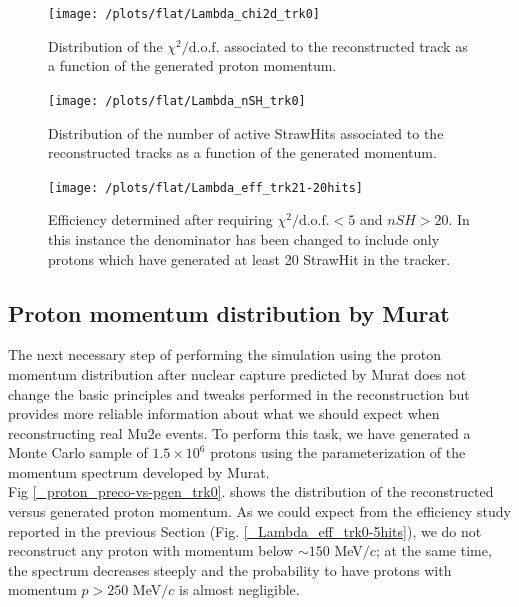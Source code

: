 \documentclass[12pt,a4paper,openright, oneside, titlepage]{book} %
\begin{document}
\begin{figure}[!htb]
\centering
\texttt{[image: /plots/flat/Lambda\_chi2d\_trk0]}
\caption[$\chi^2/\textrm{d.o.f.}$ associated to the tracks]
{Distribution of the $\chi^2/\textrm{d.o.f.}$ associated to the reconstructed track 
as a function of the generated proton momentum.}
\label{_Lambda_chi2d_trk0}
\end{figure}

\begin{figure}[!htb]
\centering
\texttt{[image: /plots/flat/Lambda\_nSH\_trk0]}
\caption[Number of StrawHits associated to a track per generated momentum]{Distribution of the number of active StrawHits associated to the reconstructed tracks 
as a function of the generated momentum.}
\label{_Lambda_nSH_trk0}
\end{figure}

\begin{figure}[!htb]
\centering
\texttt{[image: /plots/flat/Lambda\_eff\_trk21-20hits]}
\caption[Efficiency of the algorithm after requirements]{Efficiency determined after requiring $\chi^2/\textrm{d.o.f.}<5$ and $nSH>20$. 
In this instance the denominator has been changed to include only protons 
which have generated at least 20 StrawHit in the tracker.}
\label{_Lambda_eff_trk21-20hits}
\end{figure}

\subsection{Proton momentum distribution by Murat}
The next necessary step of performing the simulation using the proton momentum distribution 
after nuclear capture predicted by Murat does not change the basic principles 
and tweaks performed in the reconstruction but provides more reliable information 
about what we should expect when reconstructing real Mu2e events. 
To perform this task, we have generated a Monte Carlo sample of $1.5\times10^6$ protons 
using the parameterization of the momentum spectrum developed by Murat.\\
Fig \ref{_proton_preco-vs-pgen_trk0}. shows
the distribution of the reconstructed versus generated proton momentum. 
As we could expect from the efficiency study reported in the previous Section (Fig. \ref{_Lambda_eff_trk0-5hits}), 
we do not reconstruct any proton with momentum below $\sim 150$ MeV$/c$; 
at the same time, the spectrum decreases steeply and the probability to have 
protons with momentum $p > 250$ MeV$/c$ is almost negligible.
\end{document}
